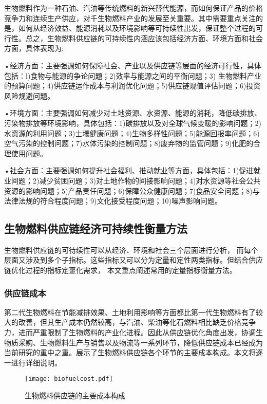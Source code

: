 生物燃料作为一种石油、汽油等传统燃料的新兴替代能源，而如何保证产品的价格竞争力和连续生产供应，对千生物燃料产业的发展至关重要\cite{Gold2011}。其中需要重点关注的是，如何从经济效益、能源消耗以及环境影响等可持续性出发，保证整个过程的可行性。总之，生物燃料供应链的可持续性内涵应该包括经济方面、环境方面和社会方面，具体表现为\cite{Awudu2012,An2011,Meyer2012,Zonin2014}:

•经济方面：主要强调如何保障社会、产业以及供应链等层面的经济可行性，具体包括：l)食物与能源的争论问题；2)效率与能源之间的平衡问题；3) 生物燃料产业的预算问题；4)供应链运作成本与利润优化问题；5)供应链现值评估问题；6)投资风险规避问题。

•环境方面：主要强调如何减少对土地资源、水资源、能源的消耗，降低碳排放、污染物排放等环境影响，具体包括：1)碳排放以及对全球气候变暖的影响问题；2)水资源的利用问题；3)士壤健康问题；4)生物多样性问题；5)能源回报率问题；6)空气污染的控制问题；7)水体污染的控制问题；8)废弃物的监管问题；9)化肥的合理使用问题。

•社会方面：主要强调如何提升社会福利、推动就业等方面，具体包括：1)促进就业间题；2)减少贫困问题；3)对土地作物的间接影响问题；4)对水资源等社会公共资源的影响问题；5)产品责任问题；6)保障公众健康问题；7)食品安全问题；8)与法律法规的符合程度问题；9)文化接受程度问题；10)噪声影响问题。

\subsection{生物燃料供应链经济可持续性衡量方法}
生物燃料供应链的可待续性可以从经济、环境和社会三个层面进行分析， 而每个层面又涉及到多个子指标。这些指标又可以分为定量和定性两类指标。但结合供应链优化过程的指标定噩化需求， 本文重点阐述常用的定量指标衡量方法。

\subsubsection{供应链成本}
第二代生物燃料在节能减排效果、土地利用影响等方面都比第一代生物燃料有了较大的改善，但其生产成本仍然较高，与汽油、柴油等化石燃料相比缺乏价格竞争力，进而严重限制了生物燃料的产业化进程\cite{Giarola2012}。因此从供应链优化角度出发，协调生物质采购、生物燃料生产与销售以及物流等一系列环节，降低供应链成本已经成为当前研究的重中之重。展示了生物燃料供应链各个环节的主要成本构成。本文将逐一进行详细说明。

\begin{figure}[!htbp]
	\centering
	\texttt{[image: biofuelcost.pdf]}
	\caption{生物燃料供应链的主要成本构成}
	\label{fig:biofuelcost}
\end{figure}

